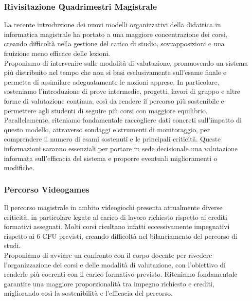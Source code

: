 \documentclass[12pt,a4paper]{article}
\begin{document}
\subsubsection{Rivisitazione Quadrimestri Magistrale}
La recente introduzione dei nuovi modelli organizzativi della didattica in informatica magistrale ha portato a una maggiore concentrazione dei corsi, creando difficoltà nella gestione del carico di studio, sovrapposizioni e una fruizione meno efficace delle lezioni.
\\ Proponiamo di intervenire sulle modalità di valutazione, promuovendo un sistema più distribuito nel tempo che non si basi esclusivamente sull’esame finale e permetta di assimilare adeguatamente le nozioni apprese. In particolare, sosteniamo l’introduzione di prove intermedie, progetti, lavori di gruppo e altre forme di valutazione continua, così da rendere il percorso più sostenibile e permettere agli studenti di seguire più corsi con maggiore equilibrio.
\\ Parallelamente, riteniamo fondamentale raccogliere dati concreti sull’impatto di questo modello, attraverso sondaggi e strumenti di monitoraggio, per comprendere il numero di esami sostenuti e le principali criticità. Queste informazioni saranno essenziali per portare in sede decisionale una valutazione informata sull’efficacia del sistema e proporre eventuali miglioramenti o modifiche.

\subsubsection{Percorso Videogames}
Il percorso magistrale in ambito videogiochi presenta attualmente diverse criticità, in particolare legate al carico di lavoro richiesto rispetto ai crediti formativi assegnati. Molti corsi risultano infatti eccessivamente impegnativi rispetto ai 6 CFU previsti, creando difficoltà nel bilanciamento del percorso di studi.
\\ Proponiamo di avviare un confronto con il corpo docente per rivedere l’organizzazione dei corsi e delle modalità di valutazione, con l’obiettivo di renderle più coerenti con il carico formativo previsto. Riteniamo fondamentale garantire una maggiore proporzionalità tra impegno richiesto e crediti, migliorando così la sostenibilità e l’efficacia del percorso.
\end{document}
